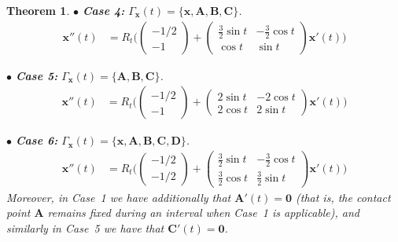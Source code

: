 \documentclass[11pt]{article}
\newtheorem{thm}{Theorem}
\newcommand{\rotmat}[1]{R_{#1}}
\newcommand{\contact}{\Gamma}
\begin{document}
\begin{thm}
\medskip \noindent $\bullet$
\textbf{Case 4:} $\contact_\mathbf{x}(t)= \{ \mathbf{x}, \mathbf{A}, \mathbf{B}, \mathbf{C} \}$.
\begin{align*}
\mathbf{x}''(t) &=
\rotmat{t}
\Bigg( \begin{pmatrix}-1/2 \\-1 \end{pmatrix}
+
\begin{pmatrix}
\frac32\sin t & -\frac32\cos t \\ \cos t & \sin t
\end{pmatrix} \mathbf{x}'(t) \Bigg)
\label{eq:ode4}
\tag{ODE4}
\end{align*}

\medskip \noindent $\bullet$
\textbf{Case 5:} $\contact_\mathbf{x}(t)= \{ \mathbf{A}, \mathbf{B}, \mathbf{C} \}$.
\begin{align*}
\mathbf{x}''(t) &=
\rotmat{t}
\Bigg(
\begin{pmatrix}-1/2 \\-1 \end{pmatrix}
+
\begin{pmatrix}
2\sin t & -2\cos t \\ 2\cos t & 2\sin t
\end{pmatrix} \mathbf{x}'(t) \Bigg)
\label{eq:ode5}
\tag{ODE5}
\end{align*}

\medskip \noindent $\bullet$
\textbf{Case 6:} $\contact_\mathbf{x}(t)= \{ \mathbf{x}, \mathbf{A}, \mathbf{B}, \mathbf{C}, \mathbf{D} \}$.
\begin{align*}
\mathbf{x}''(t) &=
\rotmat{t}
\Bigg(
\begin{pmatrix}-1/2 \\-1/2 \end{pmatrix}
+
\begin{pmatrix}
\frac32\sin t & -\frac32\cos t \\[3pt] \frac32\cos t & \frac32\sin t
\end{pmatrix} \mathbf{x}'(t) \Bigg)
\label{eq:ode6}
\tag{ODE6}
\end{align*}
Moreover, in Case~1 we have additionally that $\mathbf{A}'(t)=\mathbf{0}$ (that is, the contact point $\mathbf{A}$ remains fixed during an interval when Case~1 is applicable), and similarly in Case~5 we have that $\mathbf{C}'(t)=\mathbf{0}$.
\end{thm}
\end{document}
